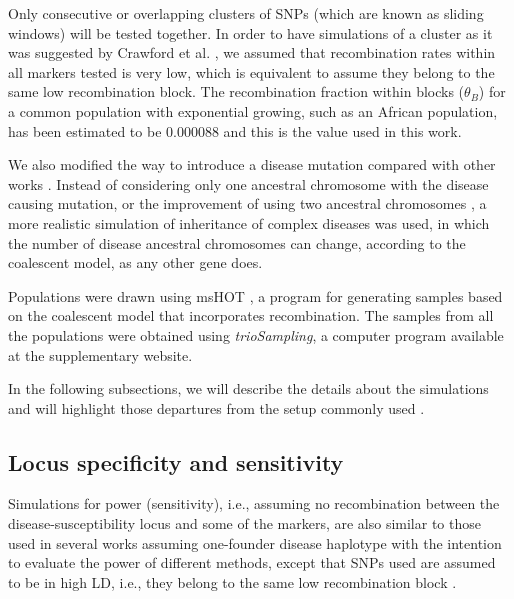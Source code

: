\documentclass[runningheads]{/home/mabad/conferences/LNCS/llncs}
\begin{document}
Only consecutive or overlapping clusters of SNPs (which are known as sliding windows) will be tested together.
In order to have simulations of a cluster as it was suggested by Crawford et al. \cite{Crawford.zz.2004}, we assumed that recombination rates within all markers tested is very low, which is equivalent to assume they belong to the same low recombination block\cite{Daly.zz.2001}.
The recombination fraction within blocks ($\theta_B$) for a common population with exponential growing, such as an African population, has been estimated to be $0.000088$ \cite{Hinds.zz.2005} and this is the value used in this work. 

We also modified the way to introduce a disease mutation compared with other works \cite{Sham.97,Zhang.zz.2003,Yu.zz.2005}. Instead of considering only one ancestral chromosome with the disease causing mutation, or the improvement of using two ancestral chromosomes \cite{Zhang.zz.2003}, a more realistic simulation of inheritance of complex diseases was used, in which the number of disease ancestral chromosomes can change, according to the coalescent model, as any other gene does.

Populations were drawn using 
msHOT \cite{Hellenthal.Stephens.2007}, a program for generating samples based on the coalescent model that incorporates recombination. 
The samples from  all the  populations were obtained using {\em trioSampling}, a computer program available at the supplementary website. 


In the following subsections, we will describe the details about the simulations and will highlight those departures from the setup  commonly used \cite{Sham.97,Zhang.zz.2003,Yu.zz.2005}.




\subsection{Locus specificity and sensitivity}


Simulations for power (sensitivity), i.e., assuming no recombination between the disease-susceptibility locus and some of the markers, are also similar to those used in several works assuming one-founder disease haplotype \cite{Lam.zz.2000,Zhang.zz.2003,Yu.zz.2005} with the intention to evaluate the power of different methods, except that SNPs used are assumed to be in high LD, i.e., they belong to the same low recombination block \cite{Daly.zz.2001}. 
\end{document}
